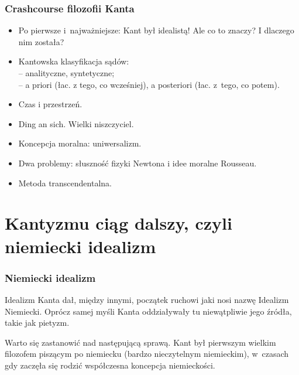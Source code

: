 \documentclass[10pt,t]{beamer}
\begin{document}
\begin{frame}
  \frametitle{Crashcourse filozofii Kanta}


  \begin{itemize}
    \RaggedRight

  \item Po pierwsze i~najważniejsze: Kant był idealistą! Ale co to
    znaczy? I dlaczego nim została?

  \item Kantowska klasyfikacja sądów: \\
    -- analityczne, syntetyczne; \\
    -- a priori (łac. z tego, co wcześniej), a posteriori (łac.
    z~tego, co potem).

  \item Czas i przestrzeń.

  \item Ding an sich. Wielki niszczyciel.

  \item Koncepcja moralna: uniwersalizm.

  \item Dwa problemy: słuszność fizyki Newtona i idee moralne
    Rousseau.

  \item Metoda transcendentalna.

  \end{itemize}

\end{frame}










\section{Kantyzmu ciąg dalszy, czyli niemiecki idealizm}



\begin{frame}
  \frametitle{Niemiecki idealizm}


  Idealizm Kanta dał, między innymi, początek ruchowi jaki nosi
  nazwę Idealizm Niemiecki. Oprócz samej myśli Kanta oddziaływały tu
  niewątpliwie jego źródła, takie jak pietyzm.

  Warto się zastanowić nad następującą sprawą. Kant był pierwszym
  wielkim filozofem piszącym po niemiecku (bardzo nieczytelnym
  niemieckim), w~czasach gdy zaczęła się rodzić współczesna
  koncepcja niemieckości.

\end{frame}
\end{document}
